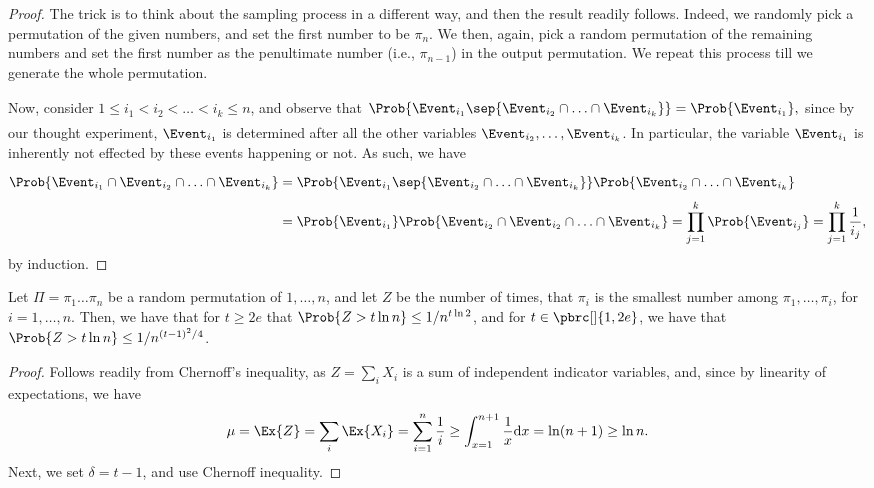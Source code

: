 \begin{proof}
    The trick is to think about the sampling process in a different
    way, and then the result readily follows. Indeed, we randomly pick
    a permutation of the given numbers, and set the first number to be
    $\pi_n$. We then, again, pick a random permutation of the
    remaining numbers and set the first number as the penultimate
    number (i.e., $\pi_{n-1}$) in the output permutation. We repeat
    this process till we generate the whole permutation.
    
    Now, consider $1 \leq i_1 < i_2 < \ldots < i_k \leq n$, and
    observe that
    \begin{math}
        \Prob{\Bigl. \Event_{i_1} \sep{ \Event_{i_2} \cap \ldots \cap
              \Event_{i_{k}} }}%
        = \Prob{\Event_{i_1}},%
    \end{math}
    since by our thought experiment, $\Event_{i_1}$ is determined
    after all the other variables
    $\Event_{i_{2}}, \ldots, \Event_{i_k}$. In particular, the
    variable $\Event_{i_1}$ is inherently not effected by these events
    happening or not. As such, we have
    \begin{align*}
        \Prob{\Bigl. \Event_{i_1} \cap \Event_{i_2} \cap \ldots \cap
           \Event_{i_k} }%
        &=%
        \Prob{\Bigl. \Event_{i_1} \sep{ \Event_{i_2} \cap \ldots \cap
              \Event_{i_{k}} }} \Prob{ \Event_{i_2} \cap \ldots \cap
           \Event_{i_{k}} }%
        \\&%
        =%
        \Prob{\Bigl. \Event_{i_1}} \Prob{\Bigl. \Event_{i_2} \cap
           \Event_{i_2} \cap \ldots \cap \Event_{i_{k}} }%
        =%
        \prod_{j=1}^k \Prob{\Event_{i_j}} = \prod_{j=1}^k
        \frac{1}{i_j},
    \end{align*}
    by induction.
\end{proof}


\begin{theorem}
    Let $\Pi=\pi_1 \ldots \pi_n$ be a random permutation of
    $1, \ldots, n$, and let $Z$ be the number of times, that $\pi_i$
    is the smallest number among $\pi_1, \ldots, \pi_i$, for
    $i=1,\ldots, n$. Then, we have that for $t \geq 2e$ that
    $\Prob{ \bigl. Z > t \ln n} \leq 1/ n^{t \ln 2}$, and for
    $t \in \pbrc[]{1, 2e}$, we have that
    $\Prob{\bigl. Z > t \ln n} \leq 1/ n^{(t-1)^2/4}$.
\end{theorem}

\begin{proof}
    Follows readily from Chernoff's inequality, as $Z=\sum_i X_i$ is a
    sum of independent indicator variables, and, since by linearity of
    expectations, we have
    \begin{align*}
        \mu%
        =%
        \Ex{\Bigl. Z}%
        =%
        \sum_i \Ex{\Big. X_i}%
        =%
        \sum_{i=1}^n \frac{1}{i}%
        \geq%
        \int_{x=1}^{n+1} \frac{1}{x} \mathrm{d}x%
        =%
        \ln (n+1)%
        \geq%
        \ln n.
    \end{align*}
    Next, we set $\delta = t-1$, and use Chernoff inequality.
\end{proof}


